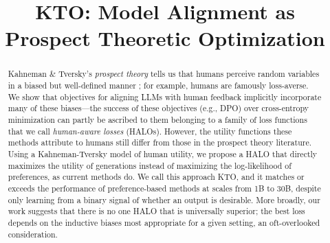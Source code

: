 \title{KTO: Model Alignment as Prospect Theoretic Optimization}




\printAffiliationsAndNotice{}  %

\begin{abstract}
Kahneman \& Tversky's \emph{prospect theory} tells us that humans perceive random variables in a biased but well-defined manner \citeyearpar{tversky1992advances}; for example, humans are famously loss-averse.
We show that objectives for aligning LLMs with human feedback implicitly incorporate many of these biases---the success of these objectives (e.g., DPO) over cross-entropy minimization can partly be ascribed to them belonging to a family of loss functions that we call \emph{human-aware losses} (HALOs).
However, the utility functions these methods attribute to humans still differ from those in the prospect theory literature.
Using a Kahneman-Tversky model of human utility, we propose a HALO that directly maximizes the utility of generations instead of maximizing the log-likelihood of preferences, as current methods do. 
We call this approach KTO, and it matches or exceeds the performance of preference-based methods at scales from 1B to 30B, despite only learning from a binary signal of whether an output is desirable.
More broadly, our work suggests that there is no one HALO that is universally superior; the best loss depends on the inductive biases most appropriate for a given setting, an oft-overlooked consideration.
\end{abstract}

